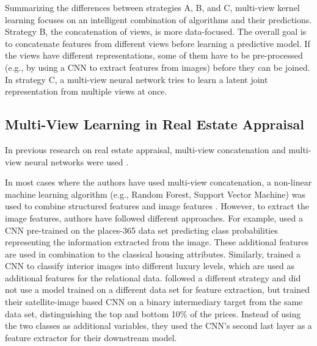 \documentclass[letterpaper]{article} %
\begin{document}
Summarizing the differences between strategies A, B, and C, multi-view kernel learning focuses on an intelligent combination of algorithms and their predictions. Strategy B, the concatenation of views, is more data-focused. The overall goal is to concatenate features from different views before learning a predictive model. If the views have different representations, some of them have to be pre-processed (e.g., by using a CNN to extract features from images) before they can be joined. In strategy C, a multi-view neural network tries to learn a latent joint representation from multiple views at once.


\subsection{Multi-View Learning in Real Estate Appraisal}
In previous research on real estate appraisal, multi-view concatenation and multi-view neural networks were used \cite{liu2018learning, law2019take, bency2017beyond}.

In most cases where the authors have used multi-view concatenation, a non-linear machine learning algorithm (e.g., Random Forest, Support Vector Machine) was used to combine structured features and image features \cite{bency2017beyond, poursaeed2018vision, bessinger2016quantifying}. However, to extract the image features, authors have followed different approaches. For example, \citeauthor{bessinger2016quantifying} \citeyearpar{bessinger2016quantifying} used a CNN pre-trained on the places-365 data set predicting class probabilities representing the information extracted from the image. These additional features are used in combination to the classical housing attributes. Similarly, \citeauthor{poursaeed2018vision} \citeyearpar{poursaeed2018vision} trained a CNN to classify interior images into different luxury levels, which are used as additional features for the relational data. \citeauthor{bency2017beyond} \citeyearpar{bency2017beyond} followed a different strategy and did not use a model trained on a different data set for feature extraction, but trained their satellite-image based CNN on a binary intermediary target from the same data set, distinguishing the top and bottom 10\% of the prices. Instead of using the two classes as additional variables, they used the CNN's second last layer as a feature extractor for their downstream model.
\end{document}
